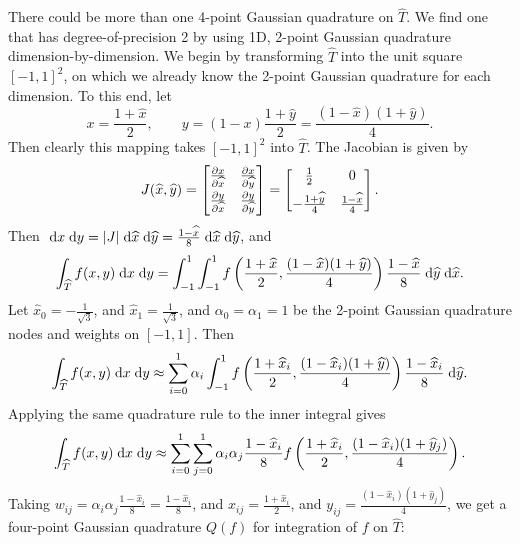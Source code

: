 \documentclass{homework}
\begin{document}
	\question 
	\begin{alphaparts}
		\newcommand{\Th}{\widehat{T}}
		\newcommand{\vh}{\widehat{v}}
		\newcommand{\xh}{\widehat{x}}
		\newcommand{\yh}{\widehat{y}}
		\questionpart There could be more than one 4-point Gaussian quadrature on $\Th$. We find one that has degree-of-precision 2 by using 1D, 2-point Gaussian quadrature dimension-by-dimension. We begin by transforming $\Th$ into the unit square $[-1,1]^2$, on which we already know the 2-point Gaussian quadrature for each dimension. To this end, let
		\begin{equation*}
			x = \frac{1 + \xh}{2}, \qquad y = (1-x)\frac{1+\yh}{2} = \frac{(1-\xh)(1+\yh)}{4}.
		\end{equation*}
		Then clearly this mapping takes $[-1,1]^2$ into $\Th$. The Jacobian is given by
		\begin{equation*}
			J(\xh, \yh) = \mat{
				\frac{\partial x}{\partial \xh} & \frac{\partial x}{\partial \yh} \\[0.5em]
				\frac{\partial y}{\partial \xh} & \frac{\partial y}{\partial \yh}
			} = \mat{\frac{1}{2} & 0 \\[0.5em] -\frac{1+\yh}{4} & \frac{1-\xh}{4}}.
		\end{equation*}
		Then $\dee x\dee y = |J|\dee\xh\dee \yh = \frac{1-\xh}{8}\dee\xh\dee\yh$, and
		\begin{equation*}
			\int_{\Th} f(x,y)\dee x\dee y = \int_{-1}^1\int_{-1}^1 f\left(\frac{1+\xh}{2}, \frac{(1-\xh)(1+\yh)}{4}\right)\frac{1-\xh}{8}\dee \yh\dee \xh.
		\end{equation*}
		Let $\xh_0 = -\frac{1}{\sqrt{3}}$, and $\xh_1 = \frac{1}{\sqrt{3}}$, and $\alpha_0 = \alpha_1 = 1$ be the 2-point Gaussian quadrature nodes and weights on $[-1,1]$. Then
		\begin{equation*}
			\int_{\Th}f(x,y)\dee x\dee y \approx \sum_{i=0}^1\alpha_i \int_{-1}^1f\left(\frac{1+\xh_i}{2}, \frac{(1-\xh_i)(1+\yh)}{4}\right)\frac{1-\xh_i}{8}\dee \yh.
		\end{equation*}
		Applying the same quadrature rule to the inner integral gives
		\begin{equation*}
			\int_{\Th}f(x,y)\dee x\dee y \approx \sum_{i=0}^1\sum_{j=0}^1 \alpha_i\alpha_j\frac{1-\xh_i}{8}f\left(\frac{1+\xh_i}{2}, \frac{(1-\xh_i)(1+\yh_j)}{4}\right).
		\end{equation*}
		Taking $w_{ij} = \alpha_i\alpha_j\frac{1-\xh_i}{8} = \frac{1-\xh_i}{8}$, and $x_{ij} = \frac{1+\xh_i}{2}$, and $y_{ij} = \frac{(1-\xh_i)(1+\yh_j)}{4}$, we get a four-point Gaussian quadrature $Q(f)$ for integration of $f$ on $\Th$:

\end{alphaparts}
\end{document}
